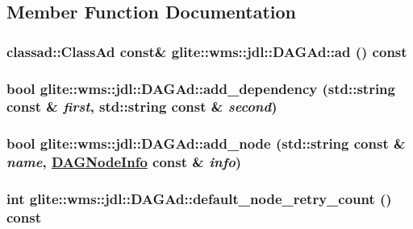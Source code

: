 \subsection{Member Function Documentation}
\hypertarget{classglite_1_1wms_1_1jdl_1_1DAGAd_a2}{
\subsubsection[ad]{\setlength{\rightskip}{0pt plus 5cm}classad::Class\-Ad const\& glite::wms::jdl::DAGAd::ad () const}}
\label{classglite_1_1wms_1_1jdl_1_1DAGAd_a2}


\hypertarget{classglite_1_1wms_1_1jdl_1_1DAGAd_a14}{
\subsubsection[add\_\-dependency]{\setlength{\rightskip}{0pt plus 5cm}bool glite::wms::jdl::DAGAd::add\_\-dependency (std::string const \& {\em first}, std::string const \& {\em second})}}
\label{classglite_1_1wms_1_1jdl_1_1DAGAd_a14}


\hypertarget{classglite_1_1wms_1_1jdl_1_1DAGAd_a9}{
\subsubsection[add\_\-node]{\setlength{\rightskip}{0pt plus 5cm}bool glite::wms::jdl::DAGAd::add\_\-node (std::string const \& {\em name}, \hyperlink{classglite_1_1wms_1_1jdl_1_1DAGNodeInfo}{DAGNode\-Info} const \& {\em info})}}
\label{classglite_1_1wms_1_1jdl_1_1DAGAd_a9}


\hypertarget{classglite_1_1wms_1_1jdl_1_1DAGAd_a8}{
\subsubsection[default\_\-node\_\-retry\_\-count]{\setlength{\rightskip}{0pt plus 5cm}int glite::wms::jdl::DAGAd::default\_\-node\_\-retry\_\-count () const}}
\label{classglite_1_1wms_1_1jdl_1_1DAGAd_a8}



